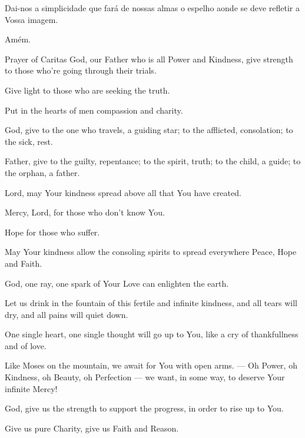 \begin{songs}{}
\begin{passage}[PT]{}
          Dai-nos a simplicidade que fará de nossas almas o
          espelho aonde se deve refletir a Vossa imagem.
          \par
          Amém.
        \end{passage}
        \begin{passage}[EN]{Prayer of Caritas}
          God, our Father who is all Power and Kindness,
          give strength to those who're going through
          their trials.
          \par
          Give light to those who are seeking the truth.
          \par
          Put in the hearts of men compassion and charity.
          \par
          God, give to the one who travels, a guiding star;
          to the afflicted, consolation; to the sick, rest.
          \par
          Father, give to the guilty, repentance; to the
          spirit, truth; to the child, a guide; to the orphan,
          a father.
          \par
          Lord, may Your kindness spread above all that You
          have created.
          \par
          Mercy, Lord, for those who don't know You.
          \par
          Hope for those who suffer.
          \par
          May Your kindness allow the consoling spirits to
          spread everywhere Peace, Hope and Faith.
          \par
          God, one ray, one spark of Your Love can enlighten
          the earth.
          \par
          Let us drink in the fountain of this fertile and
          infinite kindness, and all tears will dry, and all pains
          will quiet down.
          \par
          One single heart, one single thought will go up to
          You, like a cry of thankfullness and of love.
          \par
          Like Moses on the mountain, we await for You with
          open arms. --- Oh Power, oh Kindness, oh Beauty, oh Perfection --- we want, in some way, to deserve Your infinite Mercy!
          \par
          God, give us the strength to support the progress,
          in order to rise up to You.
          \par
          Give us pure Charity, give us Faith and Reason.

\end{passage}
\end{songs}
